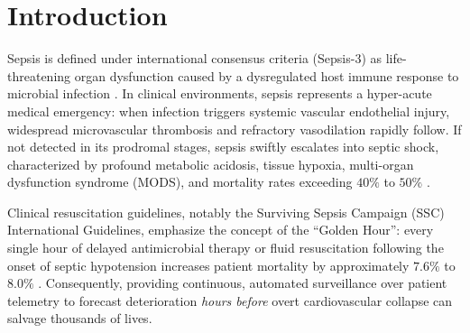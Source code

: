 \documentclass[10pt,a4paper,twocolumn,twoside]{article}
\begin{document}
\begin{abstract}
highest AUPRC of 	extbf{0.1043}, lowest ECE of 	extbf{0.0902}, and lowest Brier score of 	extbf{0.0548}. Paired cluster bootstrap testing confirms statistically equivalent discrimination to centralized BiLSTM ($P = .176$) and personalized Ditto ($P = .459$) while delivering superior probability reliability. Depending on clinical deployment requirements, FPDAF supports flexible operating modes, ranging from an \textbf{Early Bedside Screening mode} ($\tau=0.08$, Sensitivity 80.15\%, Specificity 63.85\%) to a \textbf{High-Confidence Rule-In mode} ($\tau=0.65$, Accuracy 96.20\%, Specificity 97.80\%). In a theoretical 50-round deployment model, CSSP achieves up to 38.0\% communication savings (1.52~GB vs. 2.48~GB in Ditto), while empirical 6-round logs demonstrated a 0.38\% reduction during selective freeze rounds. Paired with an operational point-of-care Clinical Decision Support System (CDSS) providing temporal window attributions, physiological feature saliency via Integrated Gradients, and counterfactual intervention simulation with a cohort mean early warning lead time of \textbf{4.98 hours} (up to 5.8 hours in exemplar cases), FPDAF provides an empirically grounded, privacy-preserving foundation for decentralized early sepsis surveillance.\\[0.15cm]
\textbf{Keywords:} Federated Learning $\cdot$ Sepsis Prediction $\cdot$ Intensive Care Units $\cdot$ Concept Drift Adaptation $\cdot$ Adaptive CUSUM $\cdot$ Dual-Phase Cross-Attention $\cdot$ Explainable AI $\cdot$ Clinical Decision Support Systems.
\end{abstract}

\section{Introduction}
Sepsis is defined under international consensus criteria (Sepsis-3) as life-threatening organ dysfunction caused by a dysregulated host immune response to microbial infection \cite{singer2016sepsis3}. In clinical environments, sepsis represents a hyper-acute medical emergency: when infection triggers systemic vascular endothelial injury, widespread microvascular thrombosis and refractory vasodilation rapidly follow. If not detected in its prodromal stages, sepsis swiftly escalates into septic shock, characterized by profound metabolic acidosis, tissue hypoxia, multi-organ dysfunction syndrome (MODS), and mortality rates exceeding $40\%$ to $50\%$ \cite{evans2021surviving,dusing2025sepsis}. 

Clinical resuscitation guidelines, notably the Surviving Sepsis Campaign (SSC) International Guidelines, emphasize the concept of the ``Golden Hour'': every single hour of delayed antimicrobial therapy or fluid resuscitation following the onset of septic hypotension increases patient mortality by approximately $7.6\%$ to $8.0\%$ \cite{evans2021surviving}. Consequently, providing continuous, automated surveillance over patient telemetry to forecast deterioration \textit{hours before} overt cardiovascular collapse can salvage thousands of lives.
\end{document}
